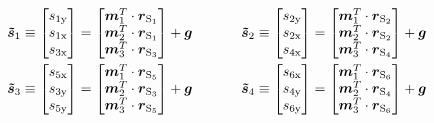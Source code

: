 \begin{equation}
\begin{split}
\boldsymbol{\tilde{s}}_{\text{1}} \equiv \begin{bmatrix}
s_{\text{1y}} \\ s_{\text{1x}} \\ s_{\text{3x}}
\end{bmatrix} = \begin{bmatrix}
\boldsymbol{m}^T_{\text{1}} \cdot \boldsymbol{r}_{\text{S}_{\text{1}}} \\
\boldsymbol{m}^T_{\text{2}} \cdot \boldsymbol{r}_{\text{S}_{\text{1}}} \\
\boldsymbol{m}^T_{\text{3}} \cdot \boldsymbol{r}_{\text{S}_{\text{3}}}
\end{bmatrix} + \boldsymbol{g} &\hspace{35pt}
\boldsymbol{\tilde{s}}_{\text{2}} \equiv \begin{bmatrix}
s_{\text{2y}} \\ s_{\text{2x}} \\ s_{\text{4x}}
\end{bmatrix} = \begin{bmatrix}
\boldsymbol{m}^T_{\text{1}} \cdot \boldsymbol{r}_{\text{S}_{\text{2}}} \\
\boldsymbol{m}^T_{\text{2}} \cdot \boldsymbol{r}_{\text{S}_{\text{2}}} \\
\boldsymbol{m}^T_{\text{3}} \cdot \boldsymbol{r}_{\text{S}_{\text{4}}}
\end{bmatrix} + \boldsymbol{g}
\\
\boldsymbol{\tilde{s}}_{\text{3}} \equiv \begin{bmatrix}
s_{\text{5x}} \\ s_{\text{3y}} \\ s_{\text{5y}}
\end{bmatrix} = \begin{bmatrix}
\boldsymbol{m}^T_{\text{1}} \cdot \boldsymbol{r}_{\text{S}_{\text{5}}} \\
\boldsymbol{m}^T_{\text{2}} \cdot \boldsymbol{r}_{\text{S}_{\text{3}}} \\
\boldsymbol{m}^T_{\text{3}} \cdot \boldsymbol{r}_{\text{S}_{\text{5}}} 
\end{bmatrix} + \boldsymbol{g} &\hspace{35pt}
\boldsymbol{\tilde{s}}_{\text{4}} \equiv \begin{bmatrix}
s_{\text{6x}} \\ s_{\text{4y}} \\ s_{\text{6y}}
\end{bmatrix} = \begin{bmatrix}
\boldsymbol{m}^T_{\text{1}} \cdot \boldsymbol{r}_{\text{S}_{\text{6}}} \\
\boldsymbol{m}^T_{\text{2}} \cdot \boldsymbol{r}_{\text{S}_{\text{4}}} \\
\boldsymbol{m}^T_{\text{3}} \cdot \boldsymbol{r}_{\text{S}_{\text{6}}}
\end{bmatrix} + \boldsymbol{g}
\end{split}
\end{equation}
